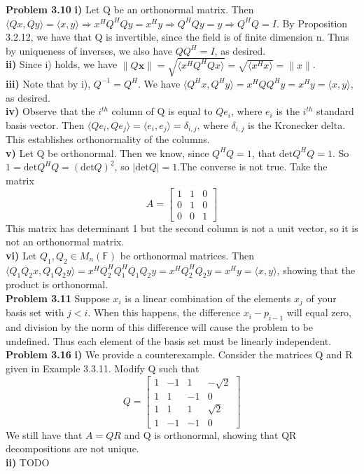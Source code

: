 \documentclass[letterpaper,12pt]{article}
\theoremstyle{definition}
\begin{document}
\noindent\textbf{Problem 3.10}
\textbf{i)} Let Q be an orthonormal matrix. Then $ \langle Qx, Qy \rangle = \langle x, y \rangle \Rightarrow x^HQ^HQy = x^Hy \Rightarrow Q^HQy = y \Rightarrow Q^HQ = I$. By Proposition 3.2.12, we have that Q is invertible, since the field is of finite dimension n. Thus by uniqueness of inverses, we also have $QQ^H = I$, as desired.\\
\textbf{ii)} Since i) holds, we have $\|Q\textbf{x}\| = \sqrt{\langle x^HQ^HQx \rangle} = \sqrt{\langle x^Hx \rangle} = \|x\|$.\\
\textbf{iii)} Note that by i), $Q^{-1} = Q^H$. We have $\langle Q^Hx, Q^Hy \rangle = x^HQQ^Hy = x^Hy = \langle x, y \rangle$, as desired.\\
\textbf{iv)} Observe that the $i^{th}$ column of Q is equal to $Qe_i$, where $e_i$ is the $i^{th}$ standard basis vector. Then $\langle Qe_i, Qe_j \rangle = \langle e_i,e_j \rangle = \delta_{i,j}$, where $\delta_{i,j}$ is the Kronecker delta. This establishes orthonormality of the columns.\\
\textbf{v)} Let Q be orthonormal. Then we know, since $Q^HQ = 1$, that $\mathrm{det} Q^HQ = 1$. So $1=\mathrm{det} Q^HQ=(\mathrm{det}Q)^2$, so $|\mathrm{det}Q| = 1$.The converse is not true. Take the matrix \[ A= 
\begin{bmatrix}
    1   & 1 & 0 \\
    0   & 1& 0 \\
    0   & 0 &1 
\end{bmatrix}
\]
This matrix has determinant 1 but the second column is not a unit vector, so it is not an orthonormal matrix.\\
\textbf{vi)} Let $Q_1,Q_2 \in M_n(\mathbb{F})$ be orthonormal matrices. Then $\langle Q_1Q_2x,Q_1Q_2y \rangle = x^HQ_2^HQ_1^HQ_1Q_2y = x^HQ_2^HQ_2y = x^Hy = \langle x, y \rangle$, showing that the product is orthonormal.\\

\noindent\textbf{Problem 3.11}
Suppose $x_i$ is a linear combination of the elements $x_j$ of your basis set with $j<i$. When this happens, the difference $x_i - p_{i-1}$ will equal zero, and division by the norm of this difference will cause the problem to be undefined. Thus each element of the basis set must be linearly independent.\\

\noindent\textbf{Problem 3.16}
\textbf{i)} We provide a counterexample. Consider the matrices Q and R given in Example 3.3.11. Modify Q such that \[ Q= 
\begin{bmatrix}
    1   & -1 & 1 & -\sqrt{2} \\
    1   & 1& -1 & 0 \\
    1   & 1 &1 &\sqrt{2}\\
    1 & -1 & -1 & 0
\end{bmatrix}
\]
We still have that $A=QR$ and Q is orthonormal, showing that QR decompositions are not unique.\\
\textbf{ii)} TODO\\
\end{document}
